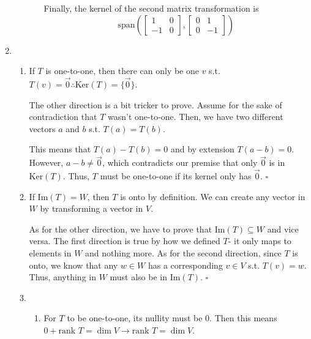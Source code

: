 \documentclass[12pt]{article}
\begin{document}
\begin{enumerate}
\begin{enumerate}
\begin{enumerate}
                              Finally, the kernel of the second matrix transformation is
                              \[\text{span}\left(\begin{bmatrix}
                                          1  & 0 \\
                                          -1 & 0
                                      \end{bmatrix}, \begin{bmatrix}
                                          0 & 1  \\
                                          0 & -1
                                      \end{bmatrix}\right)\]
                    \end{enumerate}
          \end{enumerate}
    \item \begin{enumerate}
              \item If $T$ is one-to-one, then there can only be one $v$ s.t.
                    $T(v)=\vec{0} \therefore \text{Ker}(T)=\{\vec{0}\}$.

                    The other direction is a bit tricker to prove.
                    Assume for the sake of contradiction that $T$ wasn't one-to-one.
                    Then, we have two different vectors $a$ and $b$ s.t. $T(a)=T(b)$.

                    This means that $T(a)-T(b)=0$ and by extension $T(a-b)=0$.
                    However, $a-b \ne \vec{0}$, which contradicts our premise that only $\vec{0}$ is in $\text{Ker}(T)$.
                    Thus, $T$ must be one-to-one if its kernel only has $\vec{0}$. $\square$
              \item If $\text{Im}(T)=W$, then $T$ is onto by definition.
                    We can create any vector in $W$ by transforming a vector in $V$.

                    As for the other direction, we have to prove that $\text{Im}(T) \subseteq W$ and vice versa.
                    The first direction is true by how we defined $T$- it only maps to elements in $W$ and nothing more.
                    As for the second direction, since $T$ is onto, we know that any $w \in W$ has a corresponding $v \in V$ s.t. $T(v) = w$.
                    Thus, anything in $W$ must also be in $\text{Im}(T)$. $\square$
              \item \begin{enumerate}
                        \item For $T$ to be one-to-one, its nullity must be $0$.
                              Then this means $0+\text{rank } T=\dim V \rightarrow \text{rank } T=\dim V$.


\end{enumerate}
\end{enumerate}
\end{enumerate}
\end{document}
